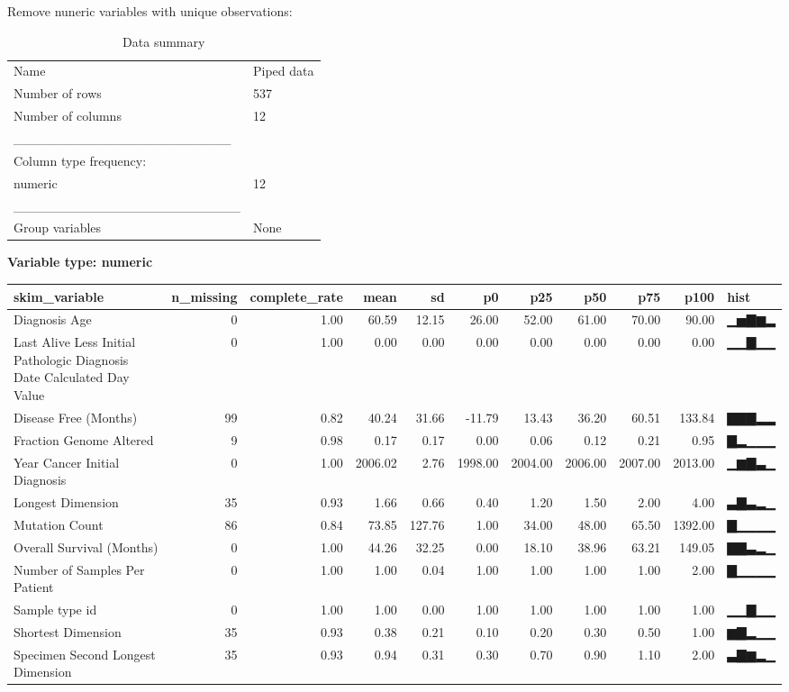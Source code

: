 \documentclass[]{article}
\newenvironment{Shaded}{\begin{snugshade}}{\end{snugshade}}
\newcommand{\KeywordTok}[1]{\textcolor[rgb]{0.13,0.29,0.53}{\textbf{#1}}}
\newcommand{\StringTok}[1]{\textcolor[rgb]{0.31,0.60,0.02}{#1}}
\newcommand{\OperatorTok}[1]{\textcolor[rgb]{0.81,0.36,0.00}{\textbf{#1}}}
\newcommand{\NormalTok}[1]{#1}
\begin{document}
Remove nuneric variables with unique observations:\\

\begin{Shaded}
\end{Shaded}

\begin{longtable}[]{@{}ll@{}}
\caption{Data summary}\tabularnewline
\toprule
Name & Piped data\tabularnewline
Number of rows & 537\tabularnewline
Number of columns & 12\tabularnewline
\_\_\_\_\_\_\_\_\_\_\_\_\_\_\_\_\_\_\_\_\_\_\_ &\tabularnewline
Column type frequency: &\tabularnewline
numeric & 12\tabularnewline
\_\_\_\_\_\_\_\_\_\_\_\_\_\_\_\_\_\_\_\_\_\_\_\_ &\tabularnewline
Group variables & None\tabularnewline
\bottomrule
\end{longtable}

\textbf{Variable type: numeric}

\begin{longtable}[]{@{}lrrrrrrrrrl@{}}
\toprule
skim\_variable & n\_missing & complete\_rate & mean & sd & p0 & p25 &
p50 & p75 & p100 & hist\tabularnewline
\midrule
\endhead
Diagnosis Age & 0 & 1.00 & 60.59 & 12.15 & 26.00 & 52.00 & 61.00 & 70.00
& 90.00 & ▁▅▇▆▂\tabularnewline
Last Alive Less Initial Pathologic Diagnosis Date Calculated Day Value &
0 & 1.00 & 0.00 & 0.00 & 0.00 & 0.00 & 0.00 & 0.00 & 0.00 &
▁▁▇▁▁\tabularnewline
Disease Free (Months) & 99 & 0.82 & 40.24 & 31.66 & -11.79 & 13.43 &
36.20 & 60.51 & 133.84 & ▇▇▇▂▂\tabularnewline
Fraction Genome Altered & 9 & 0.98 & 0.17 & 0.17 & 0.00 & 0.06 & 0.12 &
0.21 & 0.95 & ▇▂▁▁▁\tabularnewline
Year Cancer Initial Diagnosis & 0 & 1.00 & 2006.02 & 2.76 & 1998.00 &
2004.00 & 2006.00 & 2007.00 & 2013.00 & ▁▆▇▃▁\tabularnewline
Longest Dimension & 35 & 0.93 & 1.66 & 0.66 & 0.40 & 1.20 & 1.50 & 2.00
& 4.00 & ▃▇▃▂▁\tabularnewline
Mutation Count & 86 & 0.84 & 73.85 & 127.76 & 1.00 & 34.00 & 48.00 &
65.50 & 1392.00 & ▇▁▁▁▁\tabularnewline
Overall Survival (Months) & 0 & 1.00 & 44.26 & 32.25 & 0.00 & 18.10 &
38.96 & 63.21 & 149.05 & ▇▇▃▂▁\tabularnewline
Number of Samples Per Patient & 0 & 1.00 & 1.00 & 0.04 & 1.00 & 1.00 &
1.00 & 1.00 & 2.00 & ▇▁▁▁▁\tabularnewline
Sample type id & 0 & 1.00 & 1.00 & 0.00 & 1.00 & 1.00 & 1.00 & 1.00 &
1.00 & ▁▁▇▁▁\tabularnewline
Shortest Dimension & 35 & 0.93 & 0.38 & 0.21 & 0.10 & 0.20 & 0.30 & 0.50
& 1.00 & ▆▇▂▁▁\tabularnewline
Specimen Second Longest Dimension & 35 & 0.93 & 0.94 & 0.31 & 0.30 &
0.70 & 0.90 & 1.10 & 2.00 & ▃▇▆▂▁\tabularnewline
\bottomrule
\end{longtable}
\end{document}
